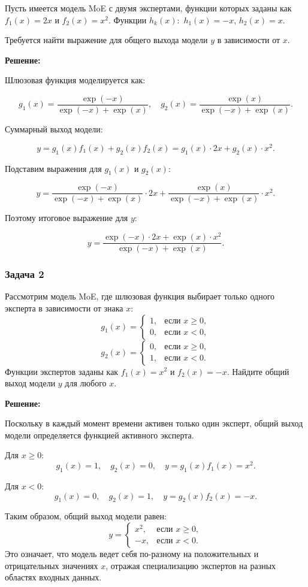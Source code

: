 Пусть имеется модель MoE с двумя экспертами, функции которых заданы как $f_1(x) = 2x$ и $f_2(x) = x^2$. Функции $h_k (x):$ $h_1 (x) = -x$, $h_2 (x) = x$.

Требуется найти выражение для общего выхода модели $y$ в зависимости от $x$.

\textbf{Решение:}

Шлюзовая функция моделируется как:

$$
g_1(x) = \frac{\exp(-x)}{\exp(-x) + \exp(x)}, \quad g_2(x) = \frac{\exp(x)}{\exp(-x) + \exp(x)}.
$$

Суммарный выход модели:

$$
y = g_1(x) f_1(x) + g_2(x) f_2(x) = g_1(x) \cdot 2x + g_2(x) \cdot x^2.
$$

Подставим выражения для $g_1(x)$ и $g_2(x)$:

$$
y = \frac{\exp(-x)}{\exp(-x) + \exp(x)} \cdot 2x + \frac{\exp(x)}{\exp(-x) + \exp(x)} \cdot x^2.
$$

Поэтому итоговое выражение для $y$:

$$
y = \frac{\exp(-x) \cdot 2x + \exp(x) \cdot x^2}{\exp(-x) + \exp(x)}.
$$

\subsubsection{Задача 2}

Рассмотрим модель MoE, где шлюзовая функция выбирает только одного эксперта в зависимости от знака $x$:
$$
g_1(x) = 
\begin{cases} 
1, & \text{если } x \geq 0, \\ 
0, & \text{если } x < 0,
\end{cases}
$$
$$
g_2(x) = 
\begin{cases} 
0, & \text{если } x \geq 0, \\ 
1, & \text{если } x < 0.
\end{cases}
$$
Функции экспертов заданы как $f_1(x) = x^2$ и $f_2(x) = -x$. Найдите общий выход модели $y$ для любого $x$.

\textbf{Решение:}

Поскольку в каждый момент времени активен только один эксперт, общий выход модели определяется функцией активного эксперта.

Для $x \geq 0$: 
$$
g_1(x) = 1, \quad g_2(x) = 0, \quad y = g_1(x) f_1(x) = x^2.
$$

Для $x < 0$: 
$$
g_1(x) = 0, \quad g_2(x) = 1, \quad y = g_2(x) f_2(x) = -x.
$$

Таким образом, общий выход модели равен:
$$
y = 
\begin{cases} 
x^2, & \text{если } x \geq 0, \\ 
-x, & \text{если } x < 0.
\end{cases}
$$
Это означает, что модель ведет себя по-разному на положительных и отрицательных значениях $x$, отражая специализацию экспертов на разных областях входных данных.

